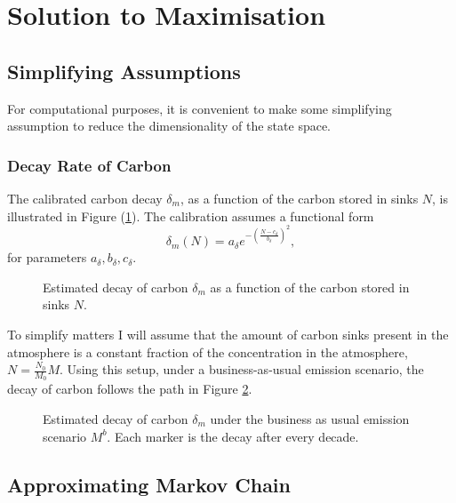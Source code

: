 \documentclass[../../main.tex]{subfiles}
\begin{document}
\section{Solution to Maximisation} \label{appendix:solution}

\subsection{Simplifying Assumptions} \label{appendix:assumptions}

For computational purposes, it is convenient to make some simplifying assumption to reduce the dimensionality of the state space.

\subsubsection{Decay Rate of Carbon}
 
The calibrated carbon decay $\delta_m$, as a function of the carbon stored in sinks $N$, is illustrated in Figure (\ref{fig:decay}). The calibration assumes a functional form \begin{equation}
    \delta_m(N) = a_{\delta} e^{-\left(\frac{N - c_{\delta}}{b_{\delta}}\right)^2},
\end{equation} for parameters $a_{\delta}, b_{\delta}, c_{\delta}$.

\begin{figure}[H]
    \centering
    
    \caption{Estimated decay of carbon $\delta_m$ as a  function of the carbon stored in sinks $N$.}
    \label{fig:decay}
\end{figure}

To simplify matters I will assume that the amount of carbon sinks present in the atmosphere is a constant fraction of the concentration in the atmosphere, $N = \frac{N_0}{M_0} M$. Using this setup, under a business-as-usual emission scenario, the decay of carbon follows the path in Figure \ref{fig:decaypath}.

\begin{figure}[H]
    \centering
    
    \caption{Estimated decay of carbon $\delta_m$ under the business as usual emission scenario $M^{b}$. Each marker is the decay after every decade.}
    \label{fig:decaypath}
\end{figure}

\subsection{Approximating Markov Chain} \label{appendix:approximating-markov-chain}
\end{document}
